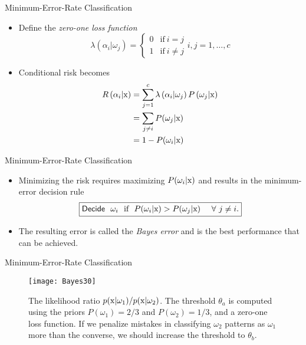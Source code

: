 \begin{frame}{Minimum-Error-Rate Classification}
\begin{itemize}
\item Define the \textit{\color{mycolor2}zero-one loss function}
\[\boxed{\lambda \left( {{\alpha _i}|{\omega _j}} \right) = \left\{ {\begin{array}{*{20}{c}}
  0&{\text{if}~i = j} \\ 
  1&{\text{if}~i \ne j} 
\end{array}} \right.i,j = 1, \ldots ,c}\]
\item Conditional risk becomes
\begin{align*}
R\left( {{\alpha _i}|{\rm x}} \right) &= \sum\limits_{j = 1}^c {\lambda \left( {{\alpha _i}|{\omega _j}} \right)P\left( {{\omega _j}|{\rm x}} \right)}\\
&=\sum_{j\neq i}P(\omega_j|{\rm x})\\
&=1-P(\omega_i|{\rm x})\\
\end{align*}
\end{itemize}
\end{frame}

\begin{frame}{Minimum-Error-Rate Classification}
\begin{itemize}
\item Minimizing the risk requires maximizing $P(\omega_i|{\rm x})$ and results in the minimum-error decision rule
\[\boxed{{\sf Decide}~~\omega_i~~\text{if}~~P(\omega_i|{\rm x})>P(\omega_j|{\rm x})~~~~\forall~j\neq i.}\]
\item The resulting error is called the \textit{\color{mycolor2}Bayes error} and is the best performance that can be achieved.
\end{itemize}
\end{frame}

\begin{frame}{Minimum-Error-Rate Classification}
\begin{figure}
\texttt{[image: Bayes30]}
\caption{The likelihood ratio $p({\rm x}|\omega_1)/p({\rm x}|\omega_2)$. The threshold $\theta_a$ is computed using the priors $P(\omega_1) = 2/3$ and $P(\omega_2) = 1/3$, and a zero-one loss function.
If we penalize mistakes in classifying $\omega_2$ patterns as $\omega_1$ more than the
converse, we should increase the threshold to $\theta_b$.}
\end{figure}
\end{frame}


